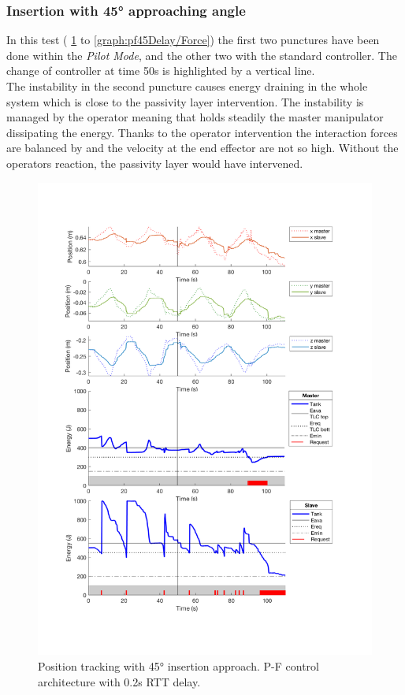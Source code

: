 \subsubsection{Insertion with 45° approaching angle}\label{sec:insertion-with-45-approaching-angle}
In this test  (\figurename{ \ref{graph:pf45Delay/Position} to \ref{graph:pf45Delay/Force}}) the first two punctures have been done within the \textit{Pilot Mode}, and the other two with the standard controller.
The change of controller at time 50s is highlighted by a vertical line.\\
The instability in the second puncture causes energy draining in the whole system which is close to the passivity layer intervention. The instability is managed by the operator meaning that holds steadily the master manipulator dissipating the energy.
Thanks to the operator intervention the interaction forces are balanced by and the velocity at the end effector are not so high.
Without the operators reaction, the passivity layer would have intervened.
\begin{center}
	\begin{figure}
		\includegraphics[width=\textwidth, keepaspectratio]{plots/pf45Delay/Position.pdf}
		\caption{Position tracking with 45° insertion approach. P-F control architecture with 0.2s RTT delay.}
		\label{graph:pf45Delay/Position}
	\end{figure}
\end{center}
